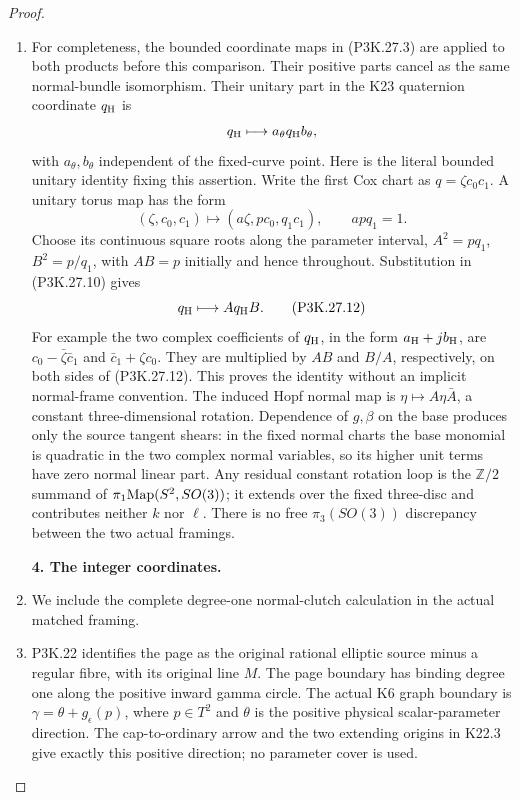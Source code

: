 \begin{proof}
\begin{enumerate}[label=\arabic*.]
\item For completeness, the bounded coordinate maps in
(P3K.27.3) are applied to both products before this
comparison. Their positive parts cancel as the same
normal-bundle isomorphism. Their unitary part in the
K23 quaternion coordinate \(q_{\rm H}\) is
\[
                   q_{\rm H}\longmapsto
                         a_\theta q_{\rm H}b_\theta,
\]
with \(a_\theta,b_\theta\) independent of the fixed-curve
point. Here is the literal bounded unitary identity fixing
this assertion. Write the first Cox chart as
\(q=\zeta c_0c_1\). A unitary torus map has the form
\[
  (\zeta,c_0,c_1)\longmapsto
                  (a\zeta,p c_0,q_1c_1),\qquad apq_1=1.
\]
Choose its continuous square roots along the parameter interval,
\(A^2=pq_1\), \(B^2=p/q_1\), with \(AB=p\) initially
and hence throughout. Substitution in (P3K.27.10) gives
\[
                      q_{\rm H}\longmapsto A q_{\rm H}B.
                                                        \tag{P3K.27.12}
\]
For example the two complex coefficients of \(q_{\rm H}\),
in the form \(a_{\rm H}+jb_{\rm H}\), are
\(c_0-\bar\zeta\bar c_1\) and
\(\bar c_1+\zeta c_0\). They are multiplied by \(AB\)
and \(B/A\), respectively, on both sides of
(P3K.27.12). This proves the identity without an implicit
normal-frame convention. The induced Hopf normal map is
\(\eta\mapsto A\eta\bar A\), a constant
three-dimensional rotation. Dependence of \(g,\beta\)
on the base produces only the source tangent shears:
in the fixed normal charts the base monomial is
quadratic in the two complex normal variables, so its
higher unit terms have zero normal linear part.
Any residual constant rotation loop is the
\(\mathbb Z/2\) summand of
\(\pi_1{\rm Map}(S^2,SO(3))\); it extends over the fixed
three-disc and contributes neither \(k\) nor \(\ell\).
There is no free \(\pi_3(SO(3))\) discrepancy between
the two actual framings.

\par\medskip\noindent\textbf{4. The integer coordinates.}\enspace

\item We include the complete degree-one normal-clutch calculation in the actual matched framing.

\item P3K.22 identifies the page as the original rational elliptic
source minus a regular fibre, with its original line \(M\).
The page boundary has binding degree one along the positive
inward gamma circle. The actual K6 graph boundary is
\(\gamma=\theta+g_\epsilon(p)\), where \(p\in T^2\) and
\(\theta\) is the positive physical scalar-parameter direction.
The cap-to-ordinary arrow and the two extending origins in K22.3
give exactly this positive direction; no parameter cover is used.


\end{enumerate}
\end{proof}
